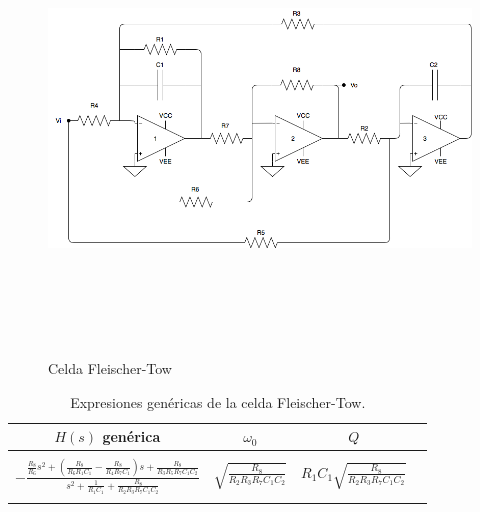 \begin{figure}[H] %
	\centering
	\includegraphics[width=12cm,height=12cm,keepaspectratio]{../EJ4/imagenes/FLEISCHER.png}
	\caption{Celda Fleischer-Tow}
	\label{fleischer}
\end{figure}

\begin{table}[h!] %
	\centering
	\begin{tabular}{c c c c}
		$H(s)$ gen\'erica & $\omega_0$ & $Q$\\
		\hline \\
		 $- \frac{\frac{R_8}{R_6}s^2+\left(\frac{R_8}{R_6R_1C_1}-\frac{R_8}{R_4R_7C_1}\right)s+\frac{R_8}{R_3R_5R_7C_1C_2}}{s^2+\frac{1}{R_1C_1}+\frac{R_8}{R_2R_3R_7C_1C_2}}$&$\sqrt{\frac{R_8}{R_2R_3R_7C_1C_2}}$&$R_1C_1\sqrt{\frac{R_8}{R_2R_3R_7C_1C_2}}$\\ \\
		\hline
	\end{tabular}
	\caption{Expresiones gen\'ericas de la celda Fleischer-Tow.}
	\label{f_generica}
\end{table}

